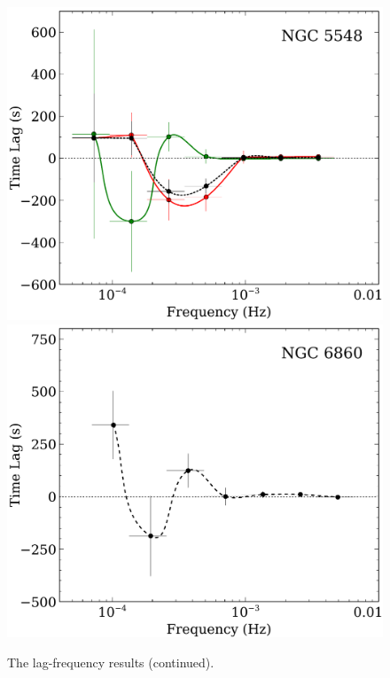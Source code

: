 \documentclass{article}
\begin{document}
\begin{figure}
\includegraphics[scale=0.4]{images/NGC5548-lag-results-lo-hi-flux-FP.pdf}
\includegraphics[scale=0.4]{images/NGC6860-lag-results-lo-hi-flux-FP.pdf}
\caption[The lag-frequency results (continued)]{The lag-frequency results (continued).}
\end{figure}
\end{document}
